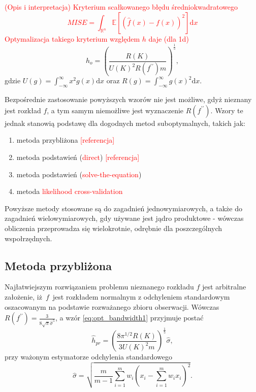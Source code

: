 \textcolor{red}{(Opis i interpretacja) Kryterium scałkowanego błędu średniokwadratowego
\begin{equation} \label{eq:mise}
MISE = \int_{\mathbb{R}^n} \mathbb{E}[(\hat{f}(x) - f(x))^2] \mathrm{d}x
\end{equation}
Optymalizacja takiego kryterium względem $h$ daje (dla 1d)}
\begin{equation} \label{eq:opt_bandwidth1}
h_o = \left( \frac{R(K)}{U(K)^2 R(f^{\prime\prime}) m} \right)^\frac{1}{5},
\end{equation}
gdzie $U(g) = \int_{-\infty}^\infty x^2 g(x) \mathrm{d}x$ oraz $R(g) = \int_{-\infty}^\infty g(x)^2\mathrm{d}x$.

Bezpośrednie zastosowanie powyższych wzorów nie jest możliwe, gdyż nieznany jest rozkład $f$, a tym samym niemożliwe jest wyznaczenie $R(f^{\prime\prime})$. Wzory te jednak stanowią podstawę dla dogodnych metod suboptymalnych, takich jak:
\begin{enumerate}
\item metoda przybliżona \textcolor{red}{[referencja]}
\item metoda podstawień (\textcolor{red}{direct}) \textcolor{red}{[referencja]}
\item metoda podstawień (\textcolor{red}{solve-the-equation})
\item metoda \textcolor{red}{likelihood cross-validation}
\end{enumerate}
Powyższe metody stosowane są do zagadnień jednowymiarowych, a także do zagadnień wielowymiarowych, gdy używane jest jądro produktowe - wówczas obliczenia przeprowadza się wielokrotnie, odrębnie dla poszczególnych wspołrzędnych.

\subsection*{Metoda przybliżona}

Najłatwiejszym rozwiązaniem problemu nieznanego rozkładu $f$ jest arbitralne założenie, iż~$f$~jest rozkładem normalnym z odchyleniem standardowym oszacowanym na podstawie rozważanego zbioru obserwacji. Wówczas $R(f^{\prime\prime}) = \frac{3}{8 \sqrt{\pi} \hat{\sigma}^5}$, a wzór \eqref{eq:opt_bandwidth1} przyjmuje postać
\begin{equation} \label{eq:normal_reference}
\hat{h}_{pr} = \left( \frac{8 \pi^{1/2} R(K)}{3 U(K)^2 m} \right)^\frac{1}{5} \hat{\sigma},
\end{equation}
przy ważonym estymatorze odchylenia standardowego
\begin{equation}
\hat{\sigma} = \sqrt{\frac{m}{m-1} \sum_{i=1}^m w_i (x_i - \sum_{i=1}^m w_i x_i)^2}.
\end{equation}

